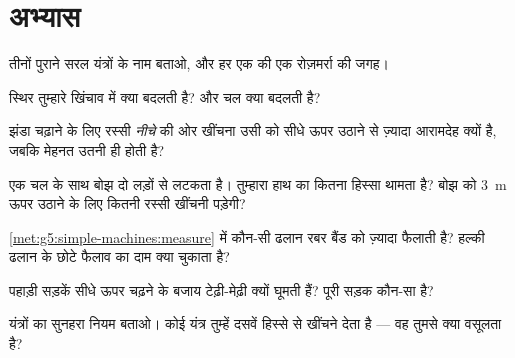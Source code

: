 \section{अभ्यास}

\begin{exercise}[$\star$]\label{exo:g5:simple-machines:1}
तीनों पुराने सरल यंत्रों के नाम बताओ, और हर एक की एक रोज़मर्रा की
जगह।
\end{exercise}

\begin{exercise}[$\star$]\label{exo:g5:simple-machines:2}
स्थिर  तुम्हारे खिंचाव में क्या बदलती है? और चल  क्या
बदलती है?
\end{exercise}

\begin{exercise}[$\star$]\label{exo:g5:simple-machines:3}
झंडा चढ़ाने के लिए रस्सी \emph{नीचे} की ओर खींचना उसी  को सीधे
ऊपर उठाने से ज़्यादा आरामदेह क्यों है, जबकि मेहनत उतनी ही होती है?
\end{exercise}

\begin{exercise}[$\star$]\label{exo:g5:simple-machines:4}
एक चल  के साथ बोझ दो लड़ों से लटकता है। तुम्हारा हाथ  का
कितना हिस्सा थामता है? बोझ को \qty{3}{m} ऊपर उठाने के लिए कितनी
रस्सी खींचनी पड़ेगी?
\end{exercise}

\begin{exercise}[$\star$]\label{exo:g5:simple-machines:5}
\cref{met:g5:simple-machines:measure} में कौन-सी ढलान रबर बैंड को
ज़्यादा फैलाती है? हल्की ढलान के छोटे फैलाव का दाम क्या चुकाता है?
\end{exercise}

\begin{exercise}[$\star$]\label{exo:g5:simple-machines:6}
पहाड़ी सड़कें सीधे ऊपर चढ़ने के बजाय टेढ़ी-मेढ़ी क्यों घूमती हैं?
पूरी सड़क कौन-सा  है?
\end{exercise}

\begin{exercise}[$\star$]\label{exo:g5:simple-machines:7}
यंत्रों का सुनहरा नियम बताओ। कोई यंत्र तुम्हें दसवें हिस्से  से
खींचने देता है --- वह तुमसे क्या वसूलता है?
\end{exercise}

